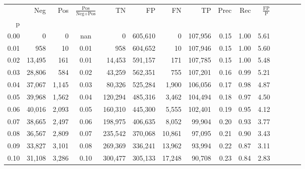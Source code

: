 \begin{tabular}{rrrcrrrrrrrrrrr}
\toprule
{} &     Neg &    Pos & $\frac{\text{Pos}}{\text{Neg}+\text{Pos}}$ &       TN &       FP &       FN &       TP &  Prec &   Rec & $\frac{\text{FP}}{\text{P}}$ \\
p    &         &        &                                            &          &          &          &          &       &       &                              \\
\midrule
0.00 &       0 &      0 &                                        nan &        0 &  605,610 &        0 &  107,956 &  0.15 &  1.00 &                         5.61 \\
0.01 &     958 &     10 &                                       0.01 &      958 &  604,652 &       10 &  107,946 &  0.15 &  1.00 &                         5.60 \\
0.02 &  13,495 &    161 &                                       0.01 &   14,453 &  591,157 &      171 &  107,785 &  0.15 &  1.00 &                         5.48 \\
0.03 &  28,806 &    584 &                                       0.02 &   43,259 &  562,351 &      755 &  107,201 &  0.16 &  0.99 &                         5.21 \\
0.04 &  37,067 &  1,145 &                                       0.03 &   80,326 &  525,284 &    1,900 &  106,056 &  0.17 &  0.98 &                         4.87 \\
0.05 &  39,968 &  1,562 &                                       0.04 &  120,294 &  485,316 &    3,462 &  104,494 &  0.18 &  0.97 &                         4.50 \\
0.06 &  40,016 &  2,093 &                                       0.05 &  160,310 &  445,300 &    5,555 &  102,401 &  0.19 &  0.95 &                         4.12 \\
0.07 &  38,665 &  2,497 &                                       0.06 &  198,975 &  406,635 &    8,052 &   99,904 &  0.20 &  0.93 &                         3.77 \\
0.08 &  36,567 &  2,809 &                                       0.07 &  235,542 &  370,068 &   10,861 &   97,095 &  0.21 &  0.90 &                         3.43 \\
0.09 &  33,827 &  3,101 &                                       0.08 &  269,369 &  336,241 &   13,962 &   93,994 &  0.22 &  0.87 &                         3.11 \\
0.10 &  31,108 &  3,286 &                                       0.10 &  300,477 &  305,133 &   17,248 &   90,708 &  0.23 &  0.84 &                         2.83 \\

\end{tabular}
